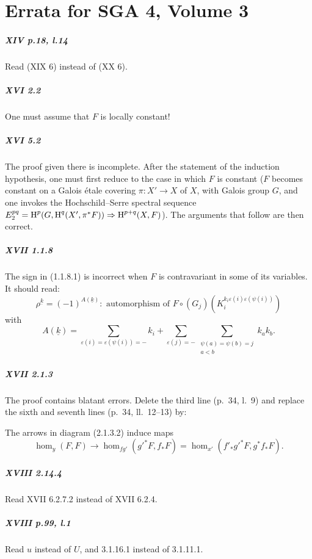 
\appendix
\chapter{Errata for SGA 4, Volume 3}

\paragraph{XIV p.18, l.14}
Read (XIX 6) instead of (XX 6).

\paragraph{XVI 2.2}
One must assume that $F$ is locally constant!

\paragraph{XVI 5.2}
The proof given there is incomplete. After the statement of the induction
hypothesis, one must first reduce to the case in which $F$ is constant
($F$ becomes constant on a Galois \'etale covering $\pi:X'\to X$ of $X$,
with Galois group $G$, and one invokes the Hochschild--Serre spectral sequence
$E_2^{p q}=\operatorname{H}^p(G,\operatorname{H}^q(X',\pi^\ast F))\Rightarrow \operatorname{H}^{p+q}(X,F)$).
The arguments that follow are then correct.

\paragraph{XVII 1.1.8}
The sign in (1.1.8.1) is incorrect when $F$ is contravariant in some of its
variables. It should read:
\begin{equation*}\tag{1.1.8.1}
  \rho^{\underline k} = (-1)^{A(\underline k)}: \text{ automorphism of }
F\circ (G_j)\left(K_i^{k_i\varepsilon(i)\varepsilon(\psi(i))}\right)
\end{equation*}
with
\[
  A(\underline k) = \sum_{\varepsilon(i) = \varepsilon(\psi(i))=-} k_i + \sum_{\varepsilon(j)=-} \sum_{\substack{\psi(a)=\psi(b)=j \\ a<b}} k_a k_b .
\]

\paragraph{XVII 2.1.3}
The proof contains blatant errors. Delete the third line (p.~34, l.~9) and
replace the sixth and seventh lines (p.~34, ll.~12--13) by:

The arrows in diagram (2.1.3.2) induce maps
\[
  \hom_y(F,F) \to \hom_{f g'}({g'}^\ast F,f_\ast F) = \hom_{x'}(f'_\ast {g'}^\ast F,g^\ast f_\ast F) \text{.}
\]

\paragraph{XVIII 2.14.4}
Read XVII 6.2.7.2 instead of XVII 6.2.4.

\paragraph{XVIII p.99, l.1}
Read $u$ instead of $U$, and 3.1.16.1 instead of 3.1.11.1.

